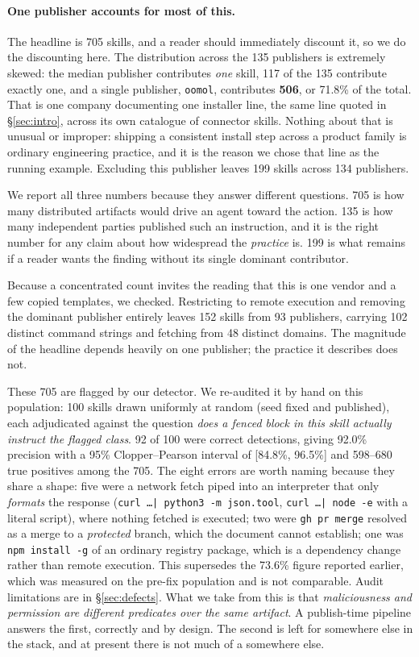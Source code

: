\documentclass[10pt]{article}
\begin{document}
\paragraph{One publisher accounts for most of this.} The headline is 705 skills, and
a reader should immediately discount it, so we do the discounting here. The
distribution across the 135 publishers is extremely skewed: the median publisher
contributes \emph{one} skill, 117 of the 135 contribute exactly one, and a single
publisher, \texttt{oomol}, contributes \textbf{506}, or 71.8\% of the total. That is
one company documenting one installer line, the same line quoted in
\S\ref{sec:intro}, across its own catalogue of connector skills. Nothing about that
is unusual or improper: shipping a consistent install step across a product family is
ordinary engineering practice, and it is the reason we chose that line as the running
example. Excluding this publisher leaves 199 skills across 134 publishers.

We report all three numbers because they answer different questions. 705 is how many
distributed artifacts would drive an agent toward the action. 135 is how many
independent parties published such an instruction, and it is the right number for any
claim about how widespread the \emph{practice} is. 199 is what remains if a reader
wants the finding without its single dominant contributor.

Because a concentrated count invites the reading that this is one vendor and a few
copied templates, we checked. Restricting to remote execution and removing the
dominant publisher entirely leaves 152 skills from 93 publishers, carrying 102
distinct command strings and fetching from 48 distinct domains. The magnitude of the
headline depends heavily on one publisher; the practice it describes does not.

These 705 are flagged by our detector. We re-audited it by hand on this population:
100 skills drawn uniformly at random (seed fixed and published), each adjudicated
against the question \emph{does a fenced block in this skill actually instruct the
flagged class}. 92 of 100 were correct detections, giving 92.0\% precision with a
95\% Clopper--Pearson interval of [84.8\%, 96.5\%] and 598--680 true positives among
the 705. The eight errors are worth naming because they share a shape: five were a
network fetch piped into an interpreter that only \emph{formats} the response
(\texttt{curl \ldots | python3 -m json.tool}, \texttt{curl \ldots | node -e} with a
literal script), where nothing fetched is executed; two were \texttt{gh pr merge}
resolved as a merge to a \emph{protected} branch, which the document cannot
establish; one was \texttt{npm install -g} of an ordinary registry package, which is
a dependency change rather than remote execution. This supersedes the 73.6\% figure
reported earlier, which was measured on the pre-fix population and is not comparable.
Audit limitations are in \S\ref{sec:defects}. What we take from this is that
\emph{maliciousness and permission are different predicates over the same artifact}.
A publish-time pipeline answers the first, correctly and by design. The second is
left for somewhere else in the stack, and at present there is not much of a somewhere
else.
\end{document}

